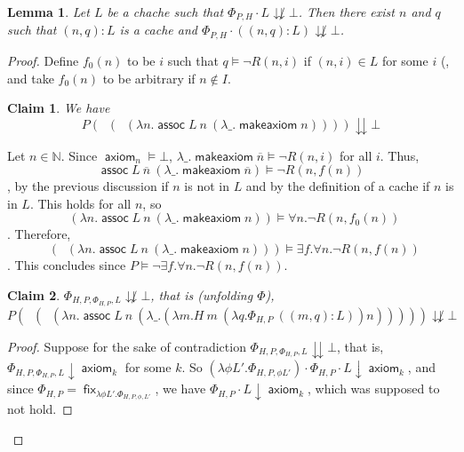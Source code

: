\documentclass{article}
\newtheorem{lemma}{Lemma}
\newtheorem{claim}{Claim}
\DeclareMathOperator{\makeaxiom}{\mathsf{makeaxiom}}
\DeclareMathOperator{\axiom}{\mathsf{axiom}}
\DeclareMathOperator{\assoc}{\mathsf{assoc}}
\DeclareMathOperator{\fix}{\mathsf{fix}}
\DeclareMathOperator{\introexists}{\mathsf{intro}_\exists}
\DeclareMathOperator{\introforall}{\mathsf{intro}_\forall}
\newcommand{\N}{\mathbb{N}}
\begin{document}
\begin{lemma}\label{addlist}
    Let $L$ be a chache such that $\Phi_{P, H} \cdot L \not\downdownarrows \bot$. Then there exist $n$ and $q$ such that $(n, q):L$ is a cache and $\Phi_{P, H} \cdot ((n, q):L) \not\downdownarrows \bot$.
\end{lemma}


\begin{proof}
    Define $f_0(n)$ to be $i$ such that $q \models \neg R(n, i)$ if $(n, i)\in L$  for some $i$ (, and take $f_0(n)$ to be arbitrary if $n \notin I$.

    \begin{claim}\label{axiomred}
        We have
        \[ P (\introexists (\introforall (\lambda n. \assoc L\ n\ (\lambda \_. \makeaxiom n)))) \downdownarrows \bot\]
    \end{claim}
    Let $n \in \N$.
    Since $\axiom_n \models \bot$, $\lambda \_. \makeaxiom \overline{n} \models \neg R(n, i)$ for all $i$.
    Thus, \[ \assoc L\ \overline{n}\ (\lambda \_. \makeaxiom \overline{n}) \models \neg R(n, f(n)) \], by the previous discussion if $n$ is not in $L$ and by the definition of a cache if $n$ is in $L$.
    This holds for all $n$, so \[ \introforall (\lambda n. \assoc L\ n\ (\lambda \_. \makeaxiom n)) \models \forall n. \neg R(n, f_0(n)) \].
    Therefore, \[ \introexists (\introforall (\lambda n. \assoc L\ n\ (\lambda \_. \makeaxiom n))) \models \exists f. \forall n. \neg R(n, f(n)) \].
    This concludes since $P \models \neg \exists f. \forall n. \neg R(n, f(n))$.

    \begin{claim}\label{notred}
        $\Phi_{H, P, \Phi_{H, P}, L} \not\downdownarrows \bot$, that is (unfolding $\Phi$),
    \[ P (\introexists (\introforall (\lambda n. \assoc L\ n\ (\lambda \_. (\lambda m. H\ m\ (\lambda q. \Phi_{H, P}\ ((m, q):L)) n))))) \not\downdownarrows \bot\]
    \end{claim}
    \begin{proof}
        Suppose for the sake of contradiction $\Phi_{H, P, \Phi_{H, P}, L} \downdownarrows \bot$, that is, $\Phi_{H, P, \Phi_{H, P}, L} \downarrow \axiom_k$ for some $k$.
        So $(\lambda \phi L'. \Phi_{H, P, \phi L'}) \cdot \Phi_{H, P} \cdot L \downarrow \axiom_k$, and since $\Phi_{H, P} = \fix_{\lambda \phi L'. \Phi_{H, P, \phi, L'}}$, we have $\Phi_{H, P} \cdot L \downarrow \axiom_k$, which was supposed to not hold.
    \end{proof}


\end{proof}
\end{document}
